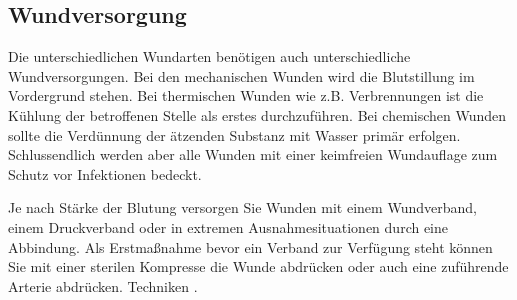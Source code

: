 \subsection{Wundversorgung}

Die unterschiedlichen Wundarten benötigen auch unterschiedliche Wundversorgungen.
Bei den mechanischen Wunden wird die Blutstillung im Vordergrund stehen. Bei
thermischen Wunden wie z.B. Verbrennungen ist die Kühlung der betroffenen Stelle
als erstes durchzuführen. Bei chemischen Wunden sollte die Verdünnung der
ätzenden Substanz mit Wasser primär erfolgen. Schlussendlich werden aber alle
Wunden mit einer keimfreien Wundauflage zum Schutz vor Infektionen bedeckt.

Je nach Stärke der Blutung versorgen Sie Wunden mit einem Wundverband, einem
Druckverband oder in extremen Ausnahmesituationen durch eine Abbindung. Als
Erstmaßnahme bevor ein Verband zur Verfügung steht können Sie mit einer sterilen
Kompresse die Wunde abdrücken oder auch eine zuführende Arterie abdrücken.
Techniken . 

